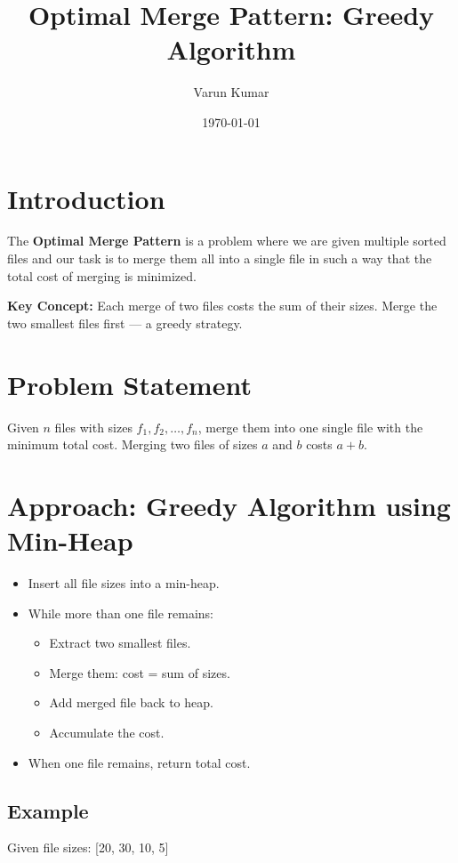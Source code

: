 \documentclass[14pt]{extarticle}
\title{Optimal Merge Pattern: Greedy Algorithm}
\author{Varun Kumar}
\date{\today}
\begin{document}
\maketitle

\tableofcontents

\lstlistoflistings
\listofalgorithms
\newpage

\section{Introduction}
The \textbf{Optimal Merge Pattern} is a problem where we are given multiple sorted files and our task is to merge them all into a single file in such a way that the total cost of merging is minimized.

\textbf{Key Concept:} Each merge of two files costs the sum of their sizes. Merge the two smallest files first — a greedy strategy.

\section{Problem Statement}
Given $n$ files with sizes $f_1, f_2, \ldots, f_n$, merge them into one single file with the minimum total cost. Merging two files of sizes $a$ and $b$ costs $a + b$.

\section{Approach: Greedy Algorithm using Min-Heap}
\begin{itemize}
    \item Insert all file sizes into a min-heap.
    \item While more than one file remains:
    \begin{itemize}
        \item Extract two smallest files.
        \item Merge them: cost = sum of sizes.
        \item Add merged file back to heap.
        \item Accumulate the cost.
    \end{itemize}
    \item When one file remains, return total cost.
\end{itemize}

\subsection{Example}
Given file sizes: [20, 30, 10, 5]
\end{document}
